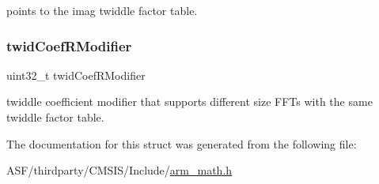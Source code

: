 points to the imag twiddle factor table. \mbox{\label{structarm__rfft__instance__f32_a5b06f7f76c018db993fe6acc5708c589}} 
\subsubsection{\texorpdfstring{twidCoefRModifier}{twidCoefRModifier}}
{\footnotesize\ttfamily uint32\+\_\+t twid\+Coef\+R\+Modifier}

twiddle coefficient modifier that supports different size F\+F\+Ts with the same twiddle factor table. 

The documentation for this struct was generated from the following file\+:\begin{DoxyCompactItemize}
\item 
A\+S\+F/thirdparty/\+C\+M\+S\+I\+S/\+Include/\mbox{\hyperlink{arm__math_8h}{arm\+\_\+math.\+h}}\end{DoxyCompactItemize}
